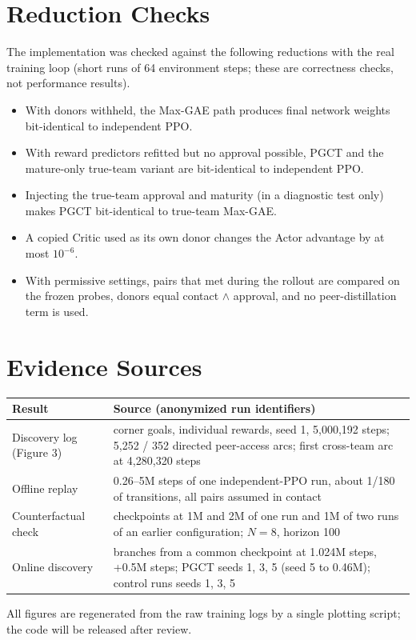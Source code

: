 \documentclass[10pt]{article}
\begin{document}
\section{Reduction Checks}
The implementation was checked against the following reductions with the real training loop (short runs of 64 environment steps; these are correctness checks, not performance results).
\begin{itemize}
\item With donors withheld, the Max-GAE path produces final network weights bit-identical to independent PPO.
\item With reward predictors refitted but no approval possible, PGCT and the mature-only true-team variant are bit-identical to independent PPO.
\item Injecting the true-team approval and maturity (in a diagnostic test only) makes PGCT bit-identical to true-team Max-GAE.
\item A copied Critic used as its own donor changes the Actor advantage by at most $10^{-6}$.
\item With permissive settings, pairs that met during the rollout are compared on the frozen probes, donors equal contact $\wedge$ approval, and no peer-distillation term is used.
\end{itemize}

\section{Evidence Sources}
\begin{table}[h]\centering\small
\begin{tabular}{p{.33\linewidth}p{.6\linewidth}}\toprule
Result & Source (anonymized run identifiers)\\\midrule
Discovery log (Figure 3) & corner goals, individual rewards, seed 1, 5{,}000{,}192 steps; 5{,}252 / 352 directed peer-access arcs; first cross-team arc at 4{,}280{,}320 steps\\
Offline replay & 0.26--5M steps of one independent-PPO run, about 1/180 of transitions, all pairs assumed in contact\\
Counterfactual check & checkpoints at 1M and 2M of one run and 1M of two runs of an earlier configuration; $N=8$, horizon 100\\
Online discovery & branches from a common checkpoint at 1.024M steps, +0.5M steps; PGCT seeds 1, 3, 5 (seed 5 to 0.46M); control runs seeds 1, 3, 5\\\bottomrule
\end{tabular}
\end{table}

All figures are regenerated from the raw training logs by a single plotting script; the code will be released after review.
\end{document}
